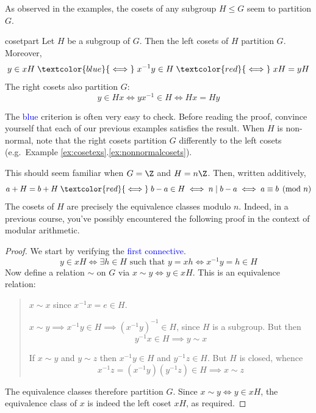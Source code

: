 \goodbreak

As observed in the examples, the cosets of any subgroup $H\le G$ seem to partition $G$.

\begin{thm}{}{cosetpart}
	Let $H$ be a subgroup of $G$. Then the left cosets of $H$ partition $G$. Moreover,
	\[
		y\in xH
		\mathrel{\textcolor{blue}{\iff}} x^{-1}y\in H
		\mathrel{\textcolor{red}{\iff}} xH=yH
	\]
	The right cosets also partition $G$:
	\[
		y\in Hx\iff yx^{-1}\in H\iff Hx=Hy
	\]
\end{thm}

The \textcolor{blue}{blue} criterion is often very easy to check. Before reading the proof, convince yourself that each of our previous examples satisfies the result. When $H$ is non-normal, note that the right cosets partition $G$ differently to the left cosets (e.g.\ Example \ref*{ex:cosetexs}.\ref{ex:nonnormalcosets}).

\begin{example}{}{}
	This should seem familiar when $G=\Z$ and $H=n\Z$. Then, written additively,
	\[
		a+H=b+H\mathrel{\textcolor{red}{\iff}} b-a\in H\iff n\mid b-a \iff a\equiv b\pmod n
	\]
	The cosets of $H$ are precisely the equivalence classes modulo $n$. Indeed, in a previous course, you've possibly encountered the following proof in the context of modular arithmetic.
\end{example}

\begin{proof}
	We start by verifying the \textcolor{blue}{first connective}.
	\[
		y\in xH
		\iff \exists h\in H\text{ such that }y=xh
		\iff x^{-1}y=h\in H
	\]
	Now define a relation $\sim$ on $G$ via $x\sim y\Longleftrightarrow y\in xH$. This is an equivalence relation:
	\begin{quote}
		\begin{description}\itemsep2pt
			\item[\normalfont\emph{Reflexivity}:] $x\sim x$ since $x^{-1}x=e\in H$.
			\item[\normalfont\emph{Symmetry}:] $x\sim y\implies x^{-1}y\in H\implies (x^{-1}y)^{-1}\in H$, since $H$ is a subgroup. But then
			\[
				y^{-1}x\in H\implies y\sim x
			\]
			\item[\normalfont\emph{Transitivity}:] If $x\sim y$ and $y\sim z$ then $x^{-1}y\in H$ and $y^{-1}z\in H$. But $H$ is closed, whence
			\[
				x^{-1}z=(x^{-1}y)(y^{-1}z)\in H\implies x\sim z
			\]
		\end{description}
	\end{quote}
	The equivalence classes therefore partition $G$. Since $x\sim y\iff y\in xH$, the equivalence class of $x$ is indeed the left coset $xH$, as required.\qedhere
\end{proof}




